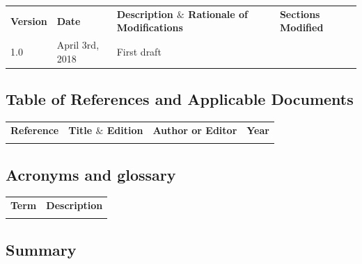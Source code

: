 \documentclass[12pt]{article}
\begin{document}
\begin{table}[H]
\large
\centering
\begin{adjustbox}{width=\textwidth}
\begin{tabular}{ |p{1.5cm}|p{2.5cm}|p{9.0cm}|p{3.0cm}| }
\hhline{----}
\textbf{Version} & \textbf{Date} & \textbf{Description  $  \&  $  Rationale of
Modifications} & \textbf{Sections Modified} \\
\hhline{----}
1.0 & April 3rd, 2018 & First draft &  \\ 
\hline
\end{tabular}
\end{adjustbox}
\end{table}

\subsection{Table of References and Applicable Documents}

\begin{table}[H]
\large
\centering
\begin{adjustbox}{width=\textwidth}
\begin{tabular}{ |p{2.66in}|p{2.66in}|p{0.95in}|p{0.43in}| }
\hhline{----}
\textbf{Reference} & \textbf{Title  $  \&  $  Edition} & \textbf{Author or
Editor} & \textbf{Year}
\\
\hhline{----}
 &  &  &  \\ 
\hline
\end{tabular}
\end{adjustbox}
\end{table}

\subsection{Acronyms and glossary}

\begin{table}[H]
\large
\centering
\begin{adjustbox}{width=\textwidth}
\begin{tabular}{ |p{1.24in}|p{5.45in}| }
\hhline{--}
\textbf{Term} & \textbf{Description} \\ 
\hhline{--}
 &  \\ 
\hline
\end{tabular}
\end{adjustbox}
\end{table}

\subsection{Summary}
\end{document}
